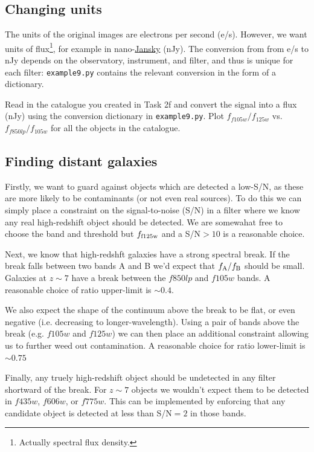 \documentclass{article}
\begin{document}
\subsection{Changing units}

The units of the original images are electrons per second (e/s). However, we want units of flux\footnote{Actually spectral flux density.}, for example in nano-\href{https://en.wikipedia.org/wiki/Jansky}{Jansky} (nJy). The conversion from from e/s to nJy depends on the observatory, instrument, and filter, and thus is unique for each filter: \texttt{example9.py} contains the relevant conversion in the form of a dictionary.

\begin{question}
Read in the catalogue you created in Task 2f and convert the signal into a flux (nJy) using the conversion dictionary in \texttt{example9.py}. Plot $f_{f105w}/f_{125w}$ vs. $f_{f850lp}/f_{105w}$ for all the objects in the catalogue.
\end{question}


\subsection{Finding distant galaxies}


Firstly, we want to guard against objects which are detected a low-S/N, as these are more likely to be contaminants (or not even real sources). To do this we can simply place a constraint on the signal-to-noise (S/N) in a filter where we know any real high-redshift object should be detected. We are somewahat free to choose the band and threshold but $f_{\rm f125w}$ and a S/N$>10$ is a reasonable choice.

Next, we know that high-redshft galaxies have a strong spectral break. If the break falls between two bands A and B we'd expect that $f_{\rm A}/f_{\rm B}$ should be small. Galaxies at $z\sim 7$ have a break between the $f850lp$ and $f105w$ bands. A reasonable choice of ratio upper-limit is $\sim 0.4$.

We also expect the shape of the continuum above the break to be flat, or even negative (i.e. decreasing to longer-wavelength). Using a pair of bands above the break (e.g. $f105w$ and $f125w$) we can then place an additional constraint allowing us to further weed out contamination. A reasonable choice for ratio lower-limit is $\sim 0.75$

Finally, any truely high-redshift object should be undetected in any filter shortward of the break. For $z\sim 7$ objects we wouldn't expect them to be detected in $f435w$, $f606w$, or $f775w$. This can be implemented by enforcing that any candidate object is detected at less than S/N$=2$ in those bands.
\end{document}
